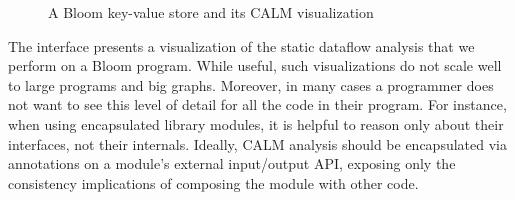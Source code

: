 \begin{figure}[t]
\vspace{-10pt}
\caption{A Bloom key-value store and its CALM visualization}
\label{fig:kvs}
\vspace{-2pt}

\end{figure}

The interface presents a visualization of the static dataflow analysis that we perform on a Bloom program.  While useful, such visualizations do not scale well to large programs and big graphs. Moreover, in many cases a programmer does not want to see this level of detail for all the code in their program.  For instance, when using encapsulated library modules, it is helpful to reason only about their interfaces, not their internals.  Ideally, CALM analysis should be encapsulated via annotations on a module's external input/output API, exposing only the consistency implications of composing the module with other code.

